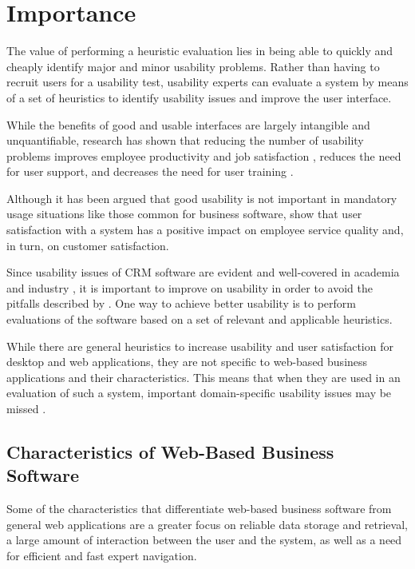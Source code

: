 \RQ{}

\section{Importance}
The value of performing a heuristic evaluation lies in being able to quickly and cheaply identify major and minor usability problems. Rather than having to recruit users for a usability test, usability experts can evaluate a system by means of a set of heuristics to identify usability issues and improve the user interface.

While the benefits of good and usable interfaces are largely intangible and unquantifiable, research has shown that reducing the number of usability problems improves employee productivity \citep[p.\ 17]{Marcus2005} and job satisfaction \citep[p.\ 19]{Preece1998}, reduces the need for user support, and decreases the need for user training \citep{Karat1990,Marcus2005}.

Although it has been argued that good usability is not important in mandatory usage situations like those common for business software, \citet{Hsiehforthcoming} show that user satisfaction with a system has a positive impact on employee service quality and, in turn, on customer satisfaction.

Since usability issues of CRM software are evident and well-covered in academia and industry \citep[e.g.][]{Band2008, Fjermestad2003a}, it is important to improve on usability in order to avoid the pitfalls described by \citet{Hsiehforthcoming}. One way to achieve better usability is to perform evaluations of the software based on a set of relevant and applicable heuristics.

While there are general heuristics to increase usability and user satisfaction for desktop and web applications, they are not specific to web-based business applications and their characteristics. This means that when they are used in an evaluation of such a system, important domain-specific usability issues may be missed \citep{Rusu2011}.

\subsection{Characteristics of Web-Based Business Software}
Some of the characteristics that differentiate web-based business software from general web applications are a greater focus on reliable data storage and retrieval, a large amount of interaction between the user and the system, as well as a need for efficient and fast expert navigation.

